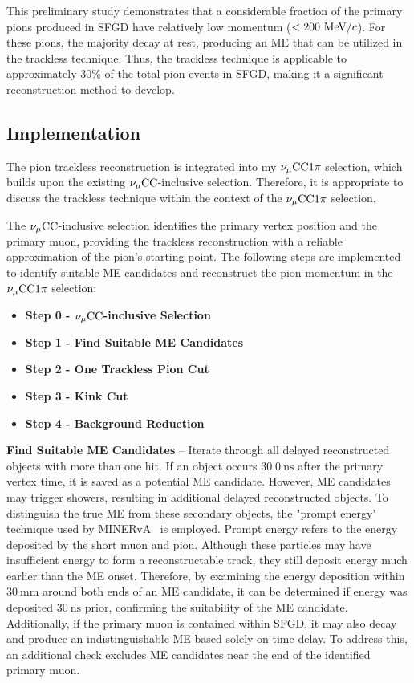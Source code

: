           This preliminary study demonstrates that a considerable fraction of the primary pions produced in SFGD have relatively low momentum ($<200~\textrm{MeV}/c$). 
          For these pions, the majority decay at rest, producing an ME that can be utilized in the trackless technique. 
          Thus, the trackless technique is applicable to approximately $30\%$ of the total pion events in SFGD, making it a significant reconstruction method to develop.


     \subsection{Implementation}
     \label{sec:tl-imp}
          The pion trackless reconstruction is integrated into my $\nu_{\mu}\textrm{CC}1\pi$ selection, which builds upon the existing $\nu_{\mu}\textrm{CC}$-inclusive selection. 
          Therefore, it is appropriate to discuss the trackless technique within the context of the $\nu_{\mu}\textrm{CC}1\pi$ selection.

          The $\nu_{\mu}\textrm{CC}$-inclusive selection identifies the primary vertex position and the primary muon, providing the trackless reconstruction with a reliable approximation of the pion's starting point. 
          The following steps are implemented to identify suitable ME candidates and reconstruct the pion momentum in the $\nu_{\mu}\textrm{CC}1\pi$ selection:
          \begin{itemize}
          \item \textbf{Step 0 - $\nu_{\mu}\textrm{CC}$-inclusive Selection}
          \item \textbf{Step 1 - Find Suitable ME Candidates}
          \item \textbf{Step 2 - One Trackless Pion Cut}
          \item \textbf{Step 3 - Kink Cut}
          \item \textbf{Step 4 - Background Reduction}
          \end{itemize}
          \textbf{Find Suitable ME Candidates} – Iterate through all delayed reconstructed objects with more than one hit. 
          If an object occurs $30.0~\textrm{ns}$ after the primary vertex time, it is saved as a potential ME candidate. 
          However, ME candidates may trigger showers, resulting in additional delayed reconstructed objects. 
          To distinguish the true ME from these secondary objects, the "prompt energy" technique used by MINERvA~\cite{Zhang:2016glf} is employed. 
          Prompt energy refers to the energy deposited by the short muon and pion. 
          Although these particles may have insufficient energy to form a reconstructable track, they still deposit energy much earlier than the ME onset. 
          Therefore, by examining the energy deposition within $30~\textrm{mm}$ around both ends of an ME candidate, it can be determined if energy was deposited $30~\textrm{ns}$ prior, confirming the suitability of the ME candidate. 
          Additionally, if the primary muon is contained within SFGD, it may also decay and produce an indistinguishable ME based solely on time delay. 
          To address this, an additional check excludes ME candidates near the end of the identified primary muon.

